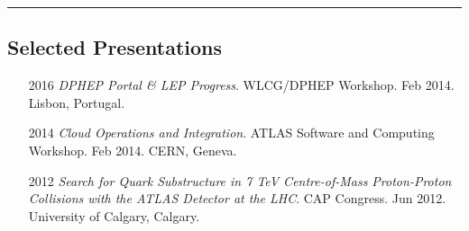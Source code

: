 \documentclass[12pt,a4paper]{article}
\newcommand{\colorrule}[1]
{
  {\color{#1}\hrule height 2pt}
  \vspace{1.0em}
}
\begin{document}
\colorrule{NavyBlue}
\subsection*{Selected Presentations}
\begin{itemize}
	\item[2016] \emph{DPHEP Portal \& LEP Progress}. WLCG/DPHEP Workshop.  Feb
		2014. Lisbon, Portugal.
	\item[2014] \emph{Cloud Operations and Integration}. ATLAS Software and
		Computing Workshop. Feb 2014. CERN, Geneva.
	\item[2012] \emph{Search for Quark Substructure in 7 TeV Centre-of-Mass
		Proton-Proton Collisions with the ATLAS Detector at the LHC}. CAP Congress.
		Jun 2012. University of Calgary, Calgary.
\end{itemize}
\end{document}
